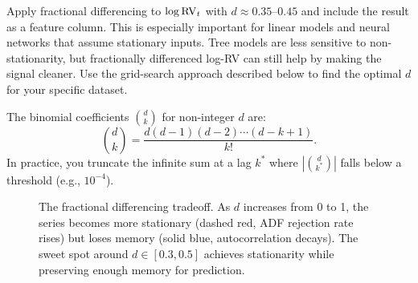 \begin{projectconnection}
Apply fractional differencing to $\log \operatorname{RV}_t$ with $d \approx 0.35$--$0.45$ and include the result as a feature column. This is especially important for linear models and neural networks that assume stationary inputs. Tree models are less sensitive to non-stationarity, but fractionally differenced log-RV can still help by making the signal cleaner. Use the grid-search approach described below to find the optimal $d$ for your specific dataset.
\end{projectconnection}

The binomial coefficients $\binom{d}{k}$ for non-integer $d$ are:
\[
\binom{d}{k} = \frac{d(d-1)(d-2)\cdots(d-k+1)}{k!}.
\]
In practice, you truncate the infinite sum at a lag $k^*$ where $|\binom{d}{k^*}|$ falls below a threshold (e.g., $10^{-4}$).

\begin{figure}[ht]
\centering
{}
\caption{The fractional differencing tradeoff. As $d$ increases from 0 to 1, the series becomes more stationary (dashed red, ADF rejection rate rises) but loses memory (solid blue, autocorrelation decays). The sweet spot around $d \in [0.3, 0.5]$ achieves stationarity while preserving enough memory for prediction.}
\label{fig:frac-diff}
\end{figure}

